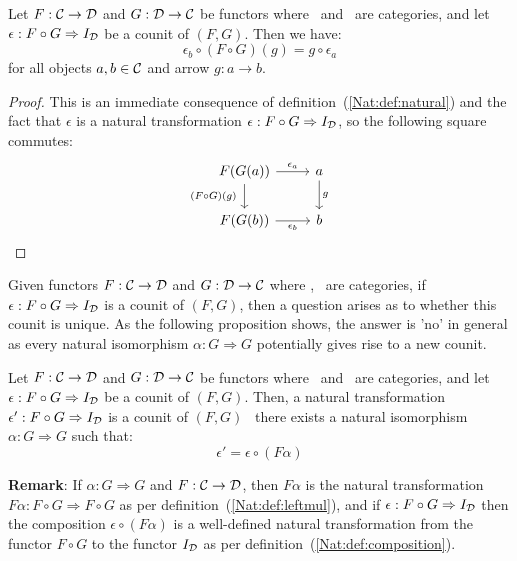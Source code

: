 \begin{prop}\label{Adj:prop:counit:natural}
    Let $F:\mbox{$\cal C$}\to\mbox{$\cal D$}$ and $G:\mbox{$\cal D$}\to\mbox{$\cal C$}$ be functors where \Cat\ and \Dat\ 
    are categories, and let $\epsilon:F\circ G\Rightarrow I_{\cal D}$ be a counit 
    of $(F,G)$. Then we have:
        \[
            \epsilon_{b}\circ(F\circ G)(g)=g\circ\epsilon_{a}
        \]
    for all objects $a,b\in\mbox{$\cal C$}$ and arrow $g:a\to b$.
\end{prop}
\begin{proof}
    This is an immediate consequence of definition~(\ref{Nat:def:natural}) 
    and the fact that $\epsilon$ is a natural transformation 
    $\epsilon:F\circ G\Rightarrow I_{\cal D}$, so the following square commutes:
    \[
        \begin{tikzcd}
            F(G(a))\arrow[r, "\epsilon_{a}"]\arrow[d, swap,"(F\circ G)(g)\ "]
            &a\arrow[d, "g"]
            \\
            F(G(b))\arrow[r, swap, "\epsilon_{b}"]
            &b
        \end{tikzcd}
    \]
\end{proof}

Given functors $F:\mbox{$\cal C$}\to\mbox{$\cal D$}$ and $G:\mbox{$\cal D$}\to\mbox{$\cal C$}$ where \Cat, \Dat\ are 
categories, if $\epsilon:F\circ G\Rightarrow I_{\cal D}$ is a counit of $(F,G)$,
then a question arises as to whether this counit is unique. As the following
proposition shows, the answer is 'no' in general as every natural 
isomorphism $\alpha : G\Rightarrow G$ potentially gives rise to a 
new counit.

\begin{prop}\label{Adj:prop:counit:not:unique}
    Let $F:\mbox{$\cal C$}\to\mbox{$\cal D$}$ and $G:\mbox{$\cal D$}\to\mbox{$\cal C$}$ be functors where \Cat\ and \Dat\ 
    are categories, and let $\epsilon:F\circ G\Rightarrow I_{\cal D}$ be a counit
    of $(F,G)$. Then, a natural transformation $\epsilon':F\circ G\Rightarrow 
    I_{\cal D}$ is a counit of $(F,G)$ \ifand\ there exists a natural isomorphism 
    $\alpha:G\Rightarrow G$ such that:
        \[
            \epsilon'=\epsilon\circ(F\alpha)
        \]
\end{prop}

\noindent
{\bf Remark}: If $\alpha: G\Rightarrow G$ and $F:\mbox{$\cal C$}\to\mbox{$\cal D$}$, then $F\alpha$
is the natural transformation $F\alpha:F\circ G\Rightarrow F\circ G$ as per
definition~(\ref{Nat:def:leftmul}), and if $\epsilon:F\circ G\Rightarrow 
I_{\cal D}$ then the composition $\epsilon\circ(F\alpha)$ is a well-defined 
natural transformation from the functor $F\circ G$ to the functor $I_{\cal D}$ 
as per definition~(\ref{Nat:def:composition}).


